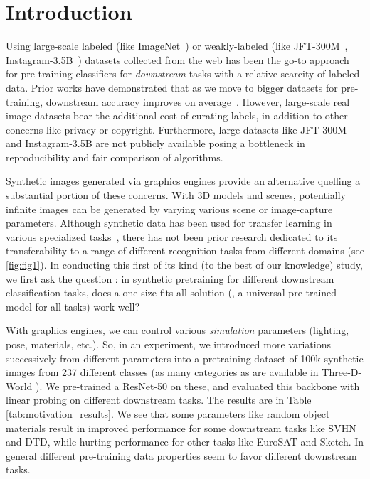 \section{Introduction} \label{sec:intro}



Using large-scale labeled (like ImageNet~\cite{deng2009imagenet}) or weakly-labeled (like JFT-300M~\cite{chollet2017xception,hinton2015distilling}, Instagram-3.5B~\cite{mahajan2018exploring}) datasets collected from the web has been the go-to approach for pre-training classifiers for \emph{downstream} tasks with a relative scarcity of labeled data. 
Prior works have demonstrated that as we move to bigger datasets for pre-training, downstream accuracy improves on average~\cite{sun2017revisiting,mahajan2018exploring}.
However, large-scale real image datasets bear the additional cost of curating labels, in addition to other concerns like privacy or copyright. Furthermore, large datasets like JFT-300M and Instagram-3.5B are not publicly available posing a bottleneck in reproducibility and fair comparison of algorithms.


Synthetic images generated via graphics engines provide an alternative quelling a substantial portion of these concerns. With 3D models and scenes, potentially infinite images can be generated by varying various scene or image-capture parameters. Although synthetic data has been used for transfer learning in various specialized tasks~\cite{su2015render, richter2016playing, tobin2017domain, anderson2021sim}, there has not been prior research dedicated to its transferability to a range of different recognition tasks from different domains (see \cref{fig:fig1}). In conducting this first of its kind (to the best of our knowledge) study, we first ask the question : in synthetic pretraining for different downstream classification tasks, does a one-size-fits-all solution (\ie, a universal pre-trained model for all tasks) work well?

With graphics engines, we can control various \emph{simulation} parameters (lighting, pose, materials, etc.). So, in an experiment, we introduced more variations successively from different parameters into a pretraining dataset of 100k synthetic images from 237 different classes (as many categories as are available in Three-D-World \cite{gan2020threedworld}). We pre-trained a ResNet-50 \cite{he2016deep} on these, and evaluated this backbone with linear probing on different downstream tasks. The results are in Table \ref{tab:motivation_results}. We see that some parameters like random object materials result in improved performance for some downstream tasks like SVHN and DTD, while hurting performance for other tasks like EuroSAT and Sketch. In general different pre-training data properties seem to favor different downstream tasks.

